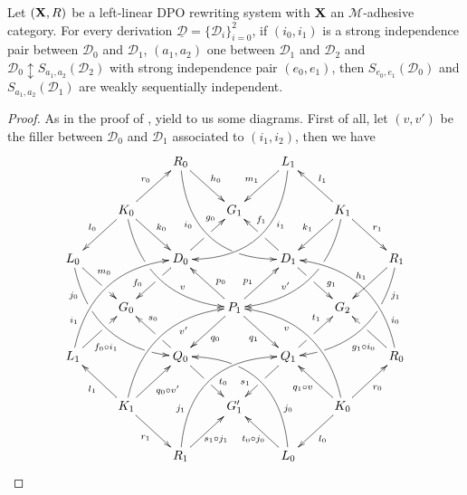 \documentclass[a4paper,UKenglish,cleveref,pdftex,thm-restate,numberwithinsect,anonymous]{lipics}
\def\R{\mathsf{R}}
\def\X{\textbf {\textup{X}}}
\newcommand{\dder}[1]{\mathscr{#1}}
\newcommand{\der}[1]{\underline{\dder{#1}}}
\begin{document}

	\begin{lemma}\label{lem:iig2}Let $(\X,\R)$ be a left-linear DPO rewriting system with $\X$ an $\mathcal{M}$-adhesive category. For every derivation $\der{D}=\{\dder{D}_i\}_{i=0}^2$, if $(i_0,i_1)$ is a strong independence pair between $\dder{D}_0$ and $\dder{D}_1$, $(a_1,a_2)$ one between $\dder{D}_1$ and $\dder{D}_2$ and $\dder{D}_0\updownarrow S_{a_1,a_2}(\dder{D}_2)$ with strong independence pair $(e_0,e_1)$, then $S_{e_0,e_1}(\dder{D}_0)$ and $S_{a_1,a_2}(\dder{D}_1)$ are weakly sequentially independent.
	\end{lemma}
	\begin{proof} As in the proof of ,  yield to us some diagrams.  First of all, let $(v,v')$ be the filler between $\dder{D}_0$ and $\dder{D}_1$ associated to $(i_1, i_2)$, then we have
		\[\xymatrix{&&R_0 \ar@/_1cm/[ddrr]_(.35){i_0}|(.7)\hole \ar[dr]^{h_0}&& L_1\ar@/^1cm/[ddll]^(.35){i_1}  \ar[dl]_{m_1}\\&K_0\ar[dr]^{k_0}\ar[dl]_{l_0} \ar@/_.8cm/[ddrr]|(.36)\hole^(.65){v}\ar[ur]^{r_0}&& G_1 && K_1 \ar@/^.8cm/[ddll]|(.36)\hole_(.65){v'}\ar[dl]_{k_1}\ar[lu]_{l_1} \ar[dr]^{r_1}\\L_0 \ar@/_.8cm/[ddrr]_(.2){j_0}|(.31)\hole|(.81)\hole \ar[dr]^(.4){m_0}|(.61)\hole && D_0 \ar[dl]|(.4)\hole_(.65){f_0}\ar[ur]|(.5)\hole^(.7){g_0}&&D_1 \ar[dr]|(.4)\hole^(.65){g_1} \ar[ul]|(.5)\hole_(.65){f_1}&&R_1\ar@/^.8cm/[ddll]^(.2){j_1}|(.31)\hole|(.81)\hole\ar[dl]_{h_1}\\&G_0 &&P_1\ar[dr]_{q_1} \ar[dl]^{q_0}\ar[ur]^(.4){p_1}\ar[ul]_(.4){p_0}&&G_2\\L_1 \ar@/^.8cm/[uurr]^(.2){i_1} \ar[ur]_(.35){f_0\circ i_1}|(.61)\hole&&Q_0 \ar[ul]|(.4)\hole_(.65){s_0}\ar[dr]|(.5)\hole^(.65){t_0} &&Q_1\ar[ur]|(.4)\hole^(.65){t_1} \ar[dl]|(.5)\hole_(.65){s_1} && R_0  \ar[ul]^(.35){g_1\circ i_0}|(.61)\hole\ar@/_.8cm/[uull]_(.2){i_0}\\&K_1 \ar[ur]_{q_0\circ v'} \ar[dr]_{r_1} \ar[ul]^{l_1}\ar@/^.8cm/[uurr]_(.65){v'}&&G'_1&& K_0 \ar[ur]_{r_0} \ar[ul]^{q_1\circ v} \ar[dl]^{l_0} \ar@/_.8cm/[uull]^(.65){v}\\&& R_1 \ar[ur]_{\hspace{-5pt}s_1\circ j_1}\ar@/^1cm/[uurr]^(.25){j_1}&& L_0 \ar[ul]^{t_0\circ j_0\hspace{-5pt}} \ar@/_1cm/[uull]_(.25){j_0} |(.69)\hole }\]


\end{proof}
\end{document}
